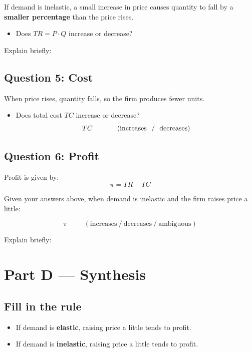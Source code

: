 \documentclass[11pt]{article}
\begin{document}
If demand is inelastic, a small increase in price causes quantity to fall by a \textbf{smaller percentage} than the price rises.

\begin{itemize}
    \item Does $TR = P \cdot Q$ increase or decrease?

\end{itemize}

Explain briefly:
\vspace{2em}

\subsection*{Question 5: Cost}

When price rises, quantity falls, so the firm produces fewer units.

\begin{itemize}
    \item Does total cost $TC$ increase or decrease?
          \[
              \text{$TC$ \hspace{1cm} (increases \ / \ decreases)}
          \]
\end{itemize}

\vspace{1em}

\subsection*{Question 6: Profit}

Profit is given by:
\[
    \pi = TR - TC
\]

Given your answers above, when demand is inelastic and the firm raises price a little:

\[
    \pi \hspace{1cm} (\text{increases} \ / \ \text{decreases} \ / \ \text{ambiguous})
\]

Explain briefly:
\vspace{3em}

\section*{Part D — Synthesis}

\subsection*{Fill in the rule}

\begin{itemize}
    \item If demand is \textbf{elastic}, raising price a little tends to \underline{\hspace{4cm}} profit.
    \item If demand is \textbf{inelastic}, raising price a little tends to \underline{\hspace{4cm}} profit.
\end{itemize}
\end{document}

